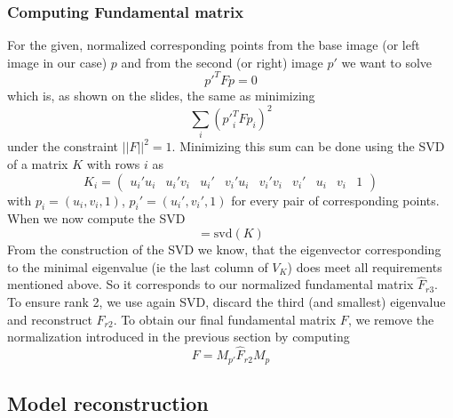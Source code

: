 \documentclass{paper}
\begin{document}
\subsubsection{Computing Fundamental matrix}
For the given, normalized corresponding points from the base image (or left image in our case) $p$ and from the second (or right) image $p'$ 
we want to solve 
\begin{equation}
	p'^T F p = 0
\end{equation}
which is, as shown on the slides, the same as minimizing
\begin{equation}
	\sum_i ({p'}_i^T F p_i)^2
\end{equation}
under the constraint $||F||^2 = 1$. Minimizing this sum can be done using the SVD of a matrix $K$ with rows $i$ as
\begin{equation}
K_i = 
\begin{pmatrix}
 u_i'u_i & u_i'v_i & u_i' & v_i'u_i & v_i'v_i & v_i' & u_i & v_i & 1 
\end{pmatrix}
\end{equation}
with $p_i = (u_i,v_i,1)$, $p_i' = (u_i',v_i',1)$ for every pair of corresponding points. When we now compute the SVD
\begin{equation}
	[U_K, D_K, V_K] = \text{svd}(K)
\end{equation}
From the construction of the SVD we know, that the eigenvector corresponding
 to the minimal eigenvalue (ie the last column of $V_K$) does meet all
  requirements mentioned above. So it corresponds to our normalized
   fundamental matrix $\hat{F}_{r3}$. To ensure rank 2, we use again SVD, 
   discard the third (and smallest) eigenvalue and reconstruct $\hat{F}_{r2}$. 
To obtain our final fundamental matrix $F$, we remove the normalization introduced in the previous section by computing 
   \begin{equation}
   F = M_{p'} \hat{F}_{r2} M_p
   \end{equation}
\subsection{Model reconstruction}


\end{document}
